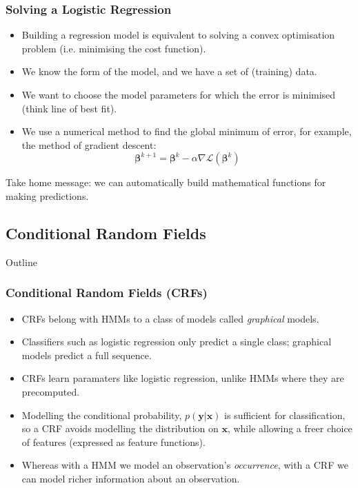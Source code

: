\documentclass{beamer}
\begin{document}

\begin{frame}
\frametitle{Solving a Logistic Regression}\begin{itemize}
\item Building a regression model is equivalent to solving a convex optimisation problem (i.e. minimising the cost function).
\item We know the form of the model, and we have a set of (training) data.
\item We want to choose the model parameters for which the error is minimised (think line of best fit).
\item We use a numerical method to find the global minimum of error, for example, the method of gradient descent:
$$\boldsymbol\beta^{k+1} = \boldsymbol\beta^{k} - \alpha\nabla\mathcal{L}(\boldsymbol\beta^{k})$$
\end{itemize}
Take home message: we can automatically build mathematical functions for making predictions.
\end{frame}


\subsection{Conditional Random Fields}


\begin{frame}[noframenumbering]{Outline}
\tableofcontents[currentsubsection]
\end{frame}


\begin{frame}
\frametitle{Conditional Random Fields (CRFs)}
\begin{itemize}
\item CRFs belong with HMMs to a class of models called \emph{graphical} models.
\item Classifiers such as logistic regression only predict a single class; graphical models predict a full sequence.
\item CRFs learn paramaters like logistic regression, unlike HMMs where they are precomputed.
\item Modelling the conditional probability, $p(\textbf{y} | \textbf{x})$ is sufficient for classification, so a CRF avoids modelling the distribution on $\textbf{x}$, while allowing a freer choice of features (expressed as feature functions).
\item Whereas with a HMM we model an observation's \emph{occurrence}, with a CRF we can  model richer information about an observation.
\end{itemize}
\end{frame}
\end{document}
